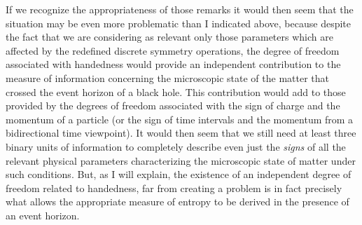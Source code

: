 \documentclass[notitlepage,12pt]{report}
\begin{document}
If we recognize the appropriateness of those remarks it would then seem that the situation may be even more problematic than I indicated above, because despite the fact that we are considering as relevant only those parameters which are affected by the redefined discrete symmetry operations, the degree of freedom associated with handedness would provide an independent contribution to the measure of information concerning the microscopic state of the matter that crossed the event horizon of a black hole. This contribution would add to those provided by the degrees of freedom associated with the sign of charge and the momentum of a particle (or the sign of time intervals and the momentum from a bidirectional time viewpoint). It would then seem that we still need at least three binary units of information to completely describe even just the \textit{signs} of all the relevant physical parameters characterizing the microscopic state of matter under such conditions. But, as I will explain, the existence of an independent degree of freedom related to handedness, far from creating a problem is in fact precisely what allows the appropriate measure of entropy to be derived in the presence of an event horizon.

\bigskip
\end{document}
